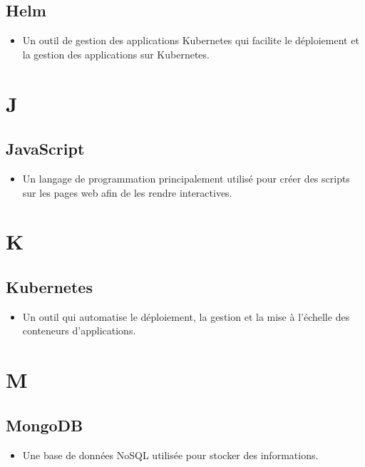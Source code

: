 \begin{multicols}{2}
    \subsection*{Helm}
    \begin{itemize}
        \item Un outil de gestion des applications Kubernetes qui facilite le déploiement et la gestion des applications sur Kubernetes.
    \end{itemize}

    \section*{J}

    \subsection*{JavaScript}
    \begin{itemize}
        \item Un langage de programmation principalement utilisé pour créer des scripts sur les pages web afin de les rendre interactives.
    \end{itemize}

    \section*{K}

    \subsection*{Kubernetes}
    \begin{itemize}
        \item Un outil qui automatise le déploiement, la gestion et la mise à l'échelle des conteneurs d'applications.
    \end{itemize}

    \section*{M}

    \subsection*{MongoDB}
    \begin{itemize}
        \item Une base de données NoSQL utilisée pour stocker des informations.
    \end{itemize}


\end{multicols}
